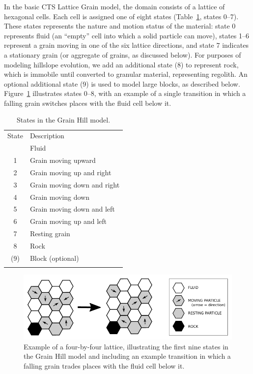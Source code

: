 \documentclass[esurf, manuscript]{copernicus}
\begin{document}
In the basic CTS Lattice Grain model, the domain consists of a lattice of hexagonal cells. Each cell is assigned one of eight states (Table~\ref{statetable}, states 0--7). These states represents the nature and motion status of the material: state 0 represents fluid  (an ``empty'' cell into which a solid particle can move), states 1--6 represent a grain moving in one of the six lattice directions, and state 7 indicates a stationary grain (or aggregate of grains, as discussed below). For purposes of modeling hillslope evolution, we add an additional state (8) to represent rock, which is immobile until converted to granular material, representing regolith. An optional additional state (9) is used to model large blocks, as described below. Figure~\ref{lattice} illustrates states 0--8, with an example of a single transition in which a falling grain switches places with the fluid cell below it. 


\begin{table}[t]
\caption{States in the Grain Hill model.}
\begin{tabular}{cl}
\tophline
State & Description \\
\middlehline
0 & Fluid \\
1 & Grain moving upward \\
2 & Grain moving up and right \\
3 & Grain moving down and right \\
4 & Grain moving down \\
5 & Grain moving down and left \\
6 & Grain moving up and left \\
7 & Resting grain \\
8 & Rock \\
(9) & Block (optional) \\
\bottomhline
\label{statetable}
\end{tabular}
\end{table}

\begin{figure}[t]
\includegraphics[width=12cm]{Figures/lattice_transition_illustration.pdf}
\caption{Example of a four-by-four lattice, illustrating the first nine states in the Grain Hill model and including an example transition in which a falling grain trades places with the fluid cell below it.}
\label{lattice}
\end{figure}
\end{document}
